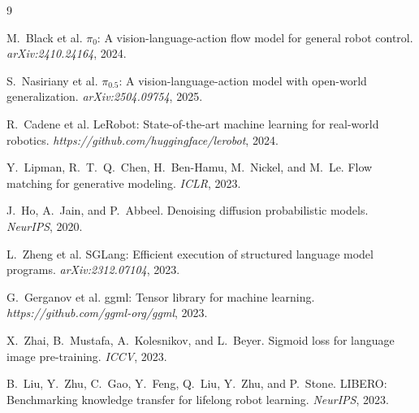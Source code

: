 \documentclass[11pt]{article}
\begin{document}
\begin{thebibliography}{9}

M.~Black et al.
\newblock $\pi_0$: A vision-language-action flow model for general robot control.
\newblock \emph{arXiv:2410.24164}, 2024.

S.~Nasiriany et al.
\newblock $\pi_{0.5}$: A vision-language-action model with open-world generalization.
\newblock \emph{arXiv:2504.09754}, 2025.

R.~Cadene et al.
\newblock LeRobot: State-of-the-art machine learning for real-world robotics.
\newblock \emph{https://github.com/huggingface/lerobot}, 2024.

Y.~Lipman, R.~T.~Q.~Chen, H.~Ben-Hamu, M.~Nickel, and M.~Le.
\newblock Flow matching for generative modeling.
\newblock \emph{ICLR}, 2023.

J.~Ho, A.~Jain, and P.~Abbeel.
\newblock Denoising diffusion probabilistic models.
\newblock \emph{NeurIPS}, 2020.

L.~Zheng et al.
\newblock SGLang: Efficient execution of structured language model programs.
\newblock \emph{arXiv:2312.07104}, 2023.

G.~Gerganov et al.
\newblock ggml: Tensor library for machine learning.
\newblock \emph{https://github.com/ggml-org/ggml}, 2023.

X.~Zhai, B.~Mustafa, A.~Kolesnikov, and L.~Beyer.
\newblock Sigmoid loss for language image pre-training.
\newblock \emph{ICCV}, 2023.

B.~Liu, Y.~Zhu, C.~Gao, Y.~Feng, Q.~Liu, Y.~Zhu, and P.~Stone.
\newblock LIBERO: Benchmarking knowledge transfer for lifelong robot learning.
\newblock \emph{NeurIPS}, 2023.

\end{thebibliography}
\end{document}
